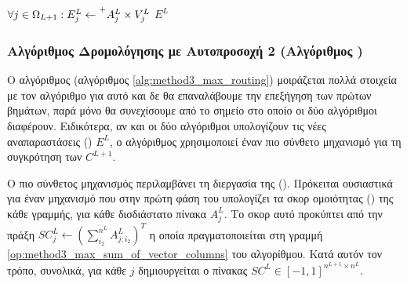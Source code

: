 {\begin{algorithm}[H]
\begin{algorithmic}[1]
      
    \State $\forall j \in \Omega_{L+1}: E^L_j \gets \prescript{+}{}{A_j^L} \times V_j^L$  \label{op:method3_sum_weighted_sum} %
    \State \Return $E^L$ 
    \EndProcedure

  \end{algorithmic}
  \end{algorithm}
}

\subsubsection{Αλγόριθμος Δρομολόγησης με Αυτο\textendash προσοχή 2 (Αλγόριθμος )}
Ο αλγόριθμος  (αλγόριθμος \ref{alg:method3_max_routing}) μοιράζεται πολλά στοιχεία με τον αλγόριθμο  για αυτό και δε θα επαναλάβουμε την επεξήγηση των πρώτων βημάτων, παρά μόνο θα συνεχίσουμε από το σημείο στο οποίο οι δύο αλγόριθμοι διαφέρουν. Ειδικότερα, αν και οι δύο αλγόριθμοι υπολογίζουν τις νέες αναπαραστάσεις () $E^L$, ο αλγόριθμος  χρησιμοποιεί έναν πιο σύνθετο μηχανισμό για τη συγκρότηση των $C^{L+1}$.\par

Ο πιο σύνθετος μηχανισμός περιλαμβάνει τη διεργασία της  (). Πρόκειται ουσιαστικά για έναν μηχανισμό που στην πρώτη φάση του υπολογίζει τα σκορ ομοιότητας () της κάθε γραμμής, για κάθε δισδιάστατο πίνακα $A_j^L$. Το σκορ αυτό προκύπτει από την πράξη $SC_j^L \gets (\sum_{i_2}^{n^L} A^L_{j:i_2})^T$ η οποία πραγματοποιείται στη γραμμή \ref{op:method3_max_sum_of_vector_columns} του αλγορίθμου. Κατά αυτόν τον τρόπο, συνολικά, για κάθε $j$ δημιουργείται ο πίνακας $SC^L \in [-1, 1]^{n^{L+1}\times n^L}$.\par

